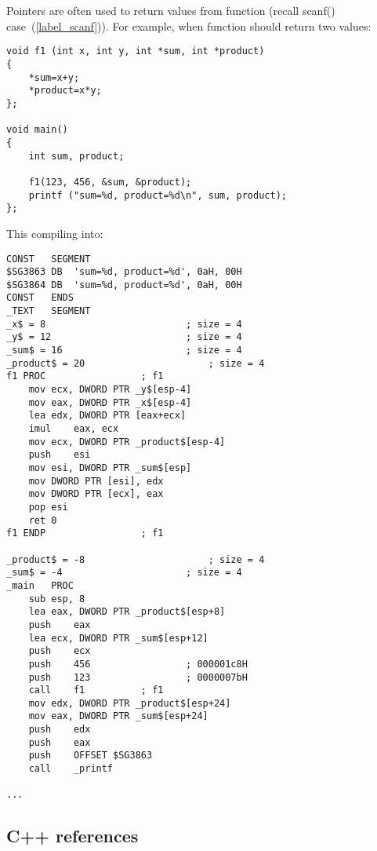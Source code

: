 \section{}
\index{\CLanguageElements!\Pointers}
\label{label_pointers}

{Pointers are often used to return values from function (recall scanf() case~(\ref{label_scanf})).}
{For example, when function should return two values:}

\begin{lstlisting}
void f1 (int x, int y, int *sum, int *product)
{
	*sum=x+y;
	*product=x*y;
};

void main()
{
	int sum, product;

	f1(123, 456, &sum, &product);
	printf ("sum=%d, product=%d\n", sum, product);
};
\end{lstlisting}

{This compiling into:}

\begin{lstlisting}[caption=\Optimizing MSVC 2010]
CONST	SEGMENT
$SG3863	DB	'sum=%d, product=%d', 0aH, 00H
$SG3864	DB	'sum=%d, product=%d', 0aH, 00H
CONST	ENDS
_TEXT	SEGMENT
_x$ = 8							; size = 4
_y$ = 12						; size = 4
_sum$ = 16						; size = 4
_product$ = 20						; size = 4
f1 PROC					; f1
	mov	ecx, DWORD PTR _y$[esp-4]
	mov	eax, DWORD PTR _x$[esp-4]
	lea	edx, DWORD PTR [eax+ecx]
	imul	eax, ecx
	mov	ecx, DWORD PTR _product$[esp-4]
	push	esi
	mov	esi, DWORD PTR _sum$[esp]
	mov	DWORD PTR [esi], edx
	mov	DWORD PTR [ecx], eax
	pop	esi
	ret	0
f1 ENDP					; f1

_product$ = -8						; size = 4
_sum$ = -4						; size = 4
_main	PROC
	sub	esp, 8
	lea	eax, DWORD PTR _product$[esp+8]
	push	eax
	lea	ecx, DWORD PTR _sum$[esp+12]
	push	ecx
	push	456					; 000001c8H
	push	123					; 0000007bH
	call	f1			; f1
	mov	edx, DWORD PTR _product$[esp+24]
	mov	eax, DWORD PTR _sum$[esp+24]
	push	edx
	push	eax
	push	OFFSET $SG3863
	call	_printf

...
\end{lstlisting}

\subsection{C++ references}


